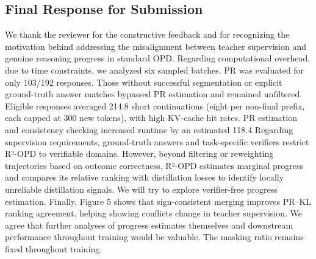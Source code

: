 \subsection*{Final Response for Submission}
\par{}
\begin{responsebox}[frametitle={Final Response to Reviewer 3 (XU6y)},linecolor=finalgreen,backgroundcolor=finalfill]

We thank the reviewer for the constructive feedback and for recognizing the motivation behind addressing the misalignment between teacher supervision and genuine reasoning progress in standard OPD.
Regarding computational overhead, due to time constraints, we analyzed six sampled batches. PR was evaluated for only 103/192 responses. Those without successful segmentation or explicit ground-truth answer matches bypassed PR estimation and remained unfiltered. Eligible responses averaged 214.8 short continuations (eight per non-final prefix, each capped at 300 new tokens), with high KV-cache hit rates. PR estimation and consistency checking increased runtime by an estimated 118.4%
Regarding supervision requirements, ground-truth answers and task-specific verifiers restrict R²-OPD to verifiable domains. However, beyond filtering or reweighting trajectories based on outcome correctness, R²-OPD estimates marginal progress and compares its relative ranking with distillation losses to identify locally unreliable distillation signals. We will try to explore verifier-free progress estimation.
Finally, Figure 5 shows that sign-consistent merging improves PR–KL ranking agreement, helping showing conflicts change in teacher supervision. We agree that further analyses of progress estimates themselves and downstream performance throughout training would be valuable. The masking ratio remains fixed throughout training.

\vspace*{4\baselineskip}
\end{responsebox}

